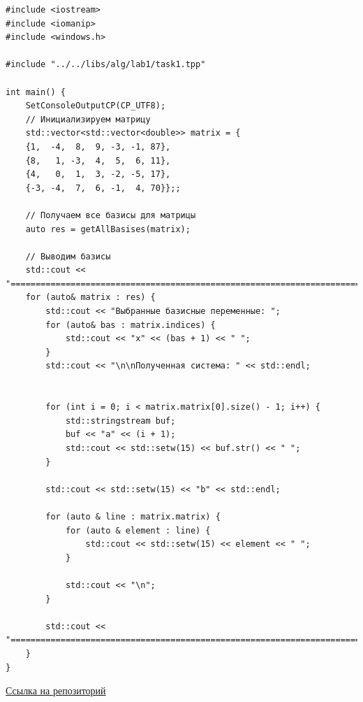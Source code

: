 \documentclass[a4paper,14pt]{extarticle}
\begin{document}
\begin{verbatim}
#include <iostream>
#include <iomanip>
#include <windows.h>

#include "../../libs/alg/lab1/task1.tpp"

int main() {
    SetConsoleOutputCP(CP_UTF8);
    // Инициализируем матрицу
    std::vector<std::vector<double>> matrix = {
    {1,  -4,  8,  9, -3, -1, 87},
    {8,   1, -3,  4,  5,  6, 11},
    {4,   0,  1,  3, -2, -5, 17},
    {-3, -4,  7,  6, -1,  4, 70}};;

    // Получаем все базисы для матрицы
    auto res = getAllBasises(matrix);

    // Выводим базисы
    std::cout << "==================================================================================================================\n";
    for (auto& matrix : res) {
        std::cout << "Выбранные базисные переменные: ";
        for (auto& bas : matrix.indices) {
            std::cout << "x" << (bas + 1) << " ";
        }
        std::cout << "\n\nПолученная система: " << std::endl;


        for (int i = 0; i < matrix.matrix[0].size() - 1; i++) {
            std::stringstream buf;
            buf << "a" << (i + 1);
            std::cout << std::setw(15) << buf.str() << " ";
        }

        std::cout << std::setw(15) << "b" << std::endl;

        for (auto & line : matrix.matrix) {
            for (auto & element : line) {
                std::cout << std::setw(15) << element << " ";
            }

            std::cout << "\n";
        }
        
        std::cout << "==================================================================================================================\n";
    }
}
    \end{verbatim}
\href{https://github.com/IAmProgrammist/operations_research/blob/master/src/lab1/task1/main.cpp}{Ссылка на репозиторий}\bigbreak
\end{document}
